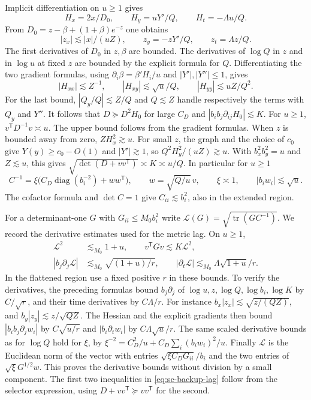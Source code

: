 \documentclass[11pt]{article}
\newcommand{\1}{\mathbf{1}}
\numberwithin{equation}{section}
\newcommand{\tr}{\operatorname{tr}}
\newcommand{\diag}{\operatorname{diag}}
\begin{document}
Implicit differentiation on \(u\ge1\) gives
\[
 H_x=2x/D_0,\qquad H_y=uY'/Q,\qquad H_t=-\Lambda u/Q.
\]
From \(D_0=z-\beta+(1+\beta)e^{-z}\) one obtains
\[
 |z_x|\lesssim |x|/(uZ),\qquad
 z_y=-zY'/Q,\qquad z_t=\Lambda z/Q .
\]
The first derivatives of \(D_0\) in \(z,\beta\) are bounded.
The derivatives of \(\log Q\) in \(z\) and in \(\log u\)
at fixed \(z\) are bounded by the explicit formula for \(Q\).
Differentiating the two gradient formulas, using
\(\partial_i\beta=\beta' H_i/u\) and \(|Y'|,|Y''|\le1\), gives
\[
 |H_{xx}|\lesssim Z^{-1},\qquad
 |H_{xy}|\lesssim \sqrt u/Q,\qquad
 |H_{yy}|\lesssim uZ/Q^2.
\]
For the last bound, \(|Q_y/Q|\lesssim Z/Q\) and \(Q\lesssim Z\)
handle respectively the terms with \(Q_y\) and \(Y''\).
It follows that \(D\succeq D^2 H_0\) for large \(C_D\)
and \(|b_i b_j\partial_{ij}H_0|\lesssim K\).
For \(u\ge1\), \(v^{\mathsf T}D^{-1}v\asymp u\).
The upper bound follows from the gradient formulas.
When \(z\) is bounded away from zero, \(Z H_x^2\gtrsim u\).
For small \(z\), the graph and the choice of \(c_0\) give
\(Y(y)\ge c_0-O(1)\) and \(|Y'|\gtrsim1\), so
\(Q^2H_y^2/(uZ)\gtrsim u\).
With \(b_x^2b_y^2=u\) and \(Z\lesssim u\), this gives
\(\sqrt{\det(D+vv^{\mathsf T})}\asymp K\asymp u/Q\).
In particular for \(u\ge1\)
\[
 C^{-1}=\xi\big(C_D\diag(b_i^{-2})+ww^{\mathsf T}\big),
 \qquad w=\sqrt{Q/u}\,v,\qquad \xi\asymp1,\qquad
 |b_iw_i|\lesssim\sqrt u .
\]
The cofactor formula and \(\det C=1\) give \(C_{ii}\lesssim b_i^2\),
also in the extended region.

For a determinant-one \(G\) with \(G_{ii}\le M_0 b_i^2\) write
\(\mathcal L(G)=\sqrt{\tr(GC^{-1})}\). We record the derivative
estimates used for the metric lag. On \(u\ge1\),
\begin{equation}\label{eq:sc-backup-lag}
\begin{split}
 \mathcal L^2&\lesssim_{M_0} 1+u,\qquad v^{\mathsf T}Gv\lesssim K\mathcal L^2,\\
 |b_j\partial_j\mathcal L|&\lesssim_{M_0}\sqrt{(1+u)/r},
 \qquad |\partial_t\mathcal L|\lesssim_{M_0}\Lambda\sqrt{1+u}/r .
\end{split}
\end{equation}
In the flattened region use a fixed positive \(r\) in these
bounds. To verify the derivatives, the preceding formulas
bound \(b_j\partial_j\) of \(\log u,z,\log Q,\log b_i,\log K\)
by \(C/\sqrt r\), and their time derivatives by \(C\Lambda/r\).
For instance \(b_x|z_x|\lesssim\sqrt{z/(QZ)}\),
and \(b_y|z_y|\lesssim z/\sqrt{QZ}\).
The Hessian and the explicit gradients then bound
\(|b_i b_j\partial_j w_i|\) by \(C\sqrt{u/r}\) and
\(|b_i\partial_t w_i|\) by \(C\Lambda\sqrt u/r\).
The same scaled derivative bounds as for \(\log Q\)
hold for \(\xi\), by
\(\xi^{-2}=C_D^2/u+C_D\sum_i(b_i w_i)^2/u\).
Finally \(\mathcal L\) is the Euclidean norm of the vector
with entries \(\sqrt{\xi C_D G_{ii}}/b_i\) and the
two entries of \(\sqrt\xi G^{1/2}w\).
This proves the derivative bounds without division by a small
component. The first two inequalities in
\eqref{eq:sc-backup-lag} follow from the selector expression,
using \(D+vv^{\mathsf T}\succeq vv^{\mathsf T}\) for the second.
\end{document}

